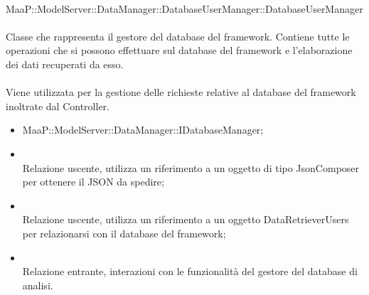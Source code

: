 \\
MaaP::ModelServer::DataManager::DatabaseUserManager::DatabaseUserManager\\
\\
Classe che rappresenta il gestore del database del framework. Contiene tutte le operazioni che si possono effettuare sul database del framework e l'elaborazione dei dati recuperati da esso.\\
\\
Viene utilizzata per la gestione delle richieste relative al database del framework inoltrate dal Controller.\\
\begin{itemize}
\item MaaP::ModelServer::DataManager::IDatabaseManager;
\end{itemize}
\begin{itemize}
\item{}\\
Relazione uscente, utilizza un riferimento a un oggetto di tipo JsonComposer per ottenere il JSON da spedire;
\item{}\\
Relazione uscente, utilizza un riferimento a un oggetto DataRetrieverUsers per relazionarsi con il database del framework;
\item{}\\
Relazione entrante, interazioni con le funzionalità del gestore del database di analisi.
\end{itemize}

